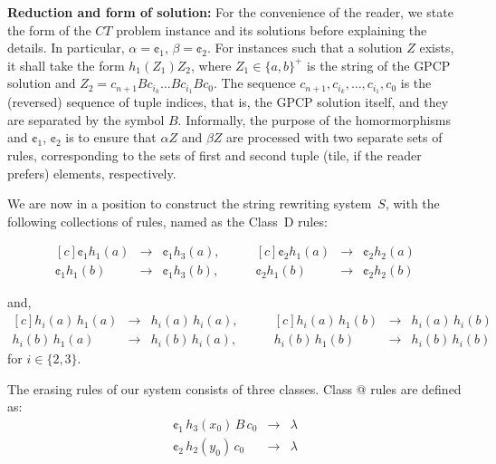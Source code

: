 \documentclass{lmcs} %
\makeatletter
\theoremstyle{plain}\newtheorem{satz}[thm]{Satz} %
\newcommand*{\rom}[1]{\expandafter\@slowromancap\romannumeral #1@}
\makeatother
\begin{document}
\textbf{Reduction and form of solution:} For the convenience of the
reader, we state the form of the $CT$ problem instance and its
solutions before explaining the details. In particular, $\alpha =
\cent_1$, $\beta = \cent_2$. For instances such that a solution $Z$
exists, it shall take the form $h_1(Z_1)Z_2$, where $Z_1 \in \{a,b\}^+$ is
the string of the GPCP solution and $Z_2 = c_{n+1}Bc_{i_k}\dots Bc_{i_1}Bc_{0}$.
The sequence $c_{n+1},c_{i_k}, \dots, c_{i_1},c_{0}$ is the
(reversed) sequence of tuple indices, that is, the GPCP solution itself,
and they are separated by the symbol $B$. Informally, the purpose of the
homormorphisms and $\cent_1$, $\cent_2$ is to ensure that $\alpha Z$ and
$\beta Z$ are processed with two separate sets of rules, corresponding to
the sets of first and second tuple (tile, if the reader prefers) elements,
respectively. 


We are now in a position to construct the string rewriting system~$S$,
with the following collections of rules, named as the Class~D rules:

\begin{equation*}
\begin{aligned}[c] \cent_1 h_1(a) & \rightarrow & \cent_1 h_3(a),\\
\cent_1 h_1(b) & \rightarrow & \cent_1 h_3(b),
\end{aligned} \qquad
\begin{aligned}[c] \cent_2 h_1(a) & \rightarrow & \cent_2 h_2(a)\\
\cent_2 h_1(b) & \rightarrow & \cent_2 h_2(b)
\end{aligned}
\end{equation*}

\noindent and,
\begin{equation*}
\begin{aligned}[c] h_i(a)\,h_1(a) & \rightarrow & h_i(a)\,h_i(a),\\
h_i(b)\,h_1(a) & \rightarrow & h_i(b)\,h_i(a),
\end{aligned} \qquad
\begin{aligned}[c] h_i(a)\,h_1(b) & \rightarrow & h_i(a)\,h_i(b)\\
h_i(b)\,h_1(b) & \rightarrow & h_i(b)\,h_i(b)
\end{aligned}
\end{equation*}
\noindent for $i \in \{2, 3\}$.

The erasing rules of our system consists of three classes. Class
\rom{1} rules are defined as:
\begin{eqnarray*} \cent_1\,h_3(x_0)\,B\,c_0 & \rightarrow & \lambda \\
\cent_2\,h_2(y_0)\,c_0 & \rightarrow & \lambda
\end{eqnarray*}
\end{document}
